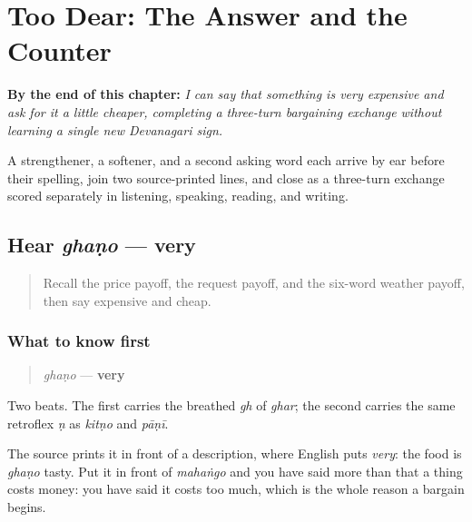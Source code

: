
\chapter{Too Dear: The Answer and the Counter}
\label{ch:mw-bargain}

\begin{chapteropening}
\textbf{By the end of this chapter:} \emph{I can say that something is very expensive and ask for it a little cheaper, completing a three-turn bargaining exchange without learning a single new Devanagari sign.}

A strengthener, a softener, and a second asking word each arrive by ear before their spelling, join two source-printed lines, and close as a three-turn exchange scored separately in listening, speaking, reading, and writing.
\end{chapteropening}

\section[ghaṇo]{Hear \emph{ghaṇo} — very}

\label{lesson:MW-C23-hear-ghano}



\begin{quote}
Recall the price payoff, the request payoff, and the six-word weather payoff, then say expensive and cheap.
\end{quote}

\subsection*{What to know first}
\begin{quote}
\emph{ghaṇo} — \textbf{very}
\end{quote}

Two beats. The first carries the breathed \emph{gh} of \emph{ghar}; the second carries the same retroflex \emph{ṇ} as \emph{kitṇo} and \emph{pāṇī}.

The source prints it in front of a description, where English puts \emph{very}: the food is \emph{ghaṇo} tasty. Put it in front of \emph{mahaṅgo} and you have said more than that a thing costs money: you have said it costs too much, which is the whole reason a bargain begins.

